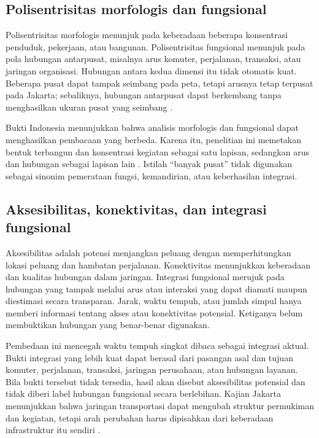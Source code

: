 \documentclass[11pt,a4paper,oneside,openany,indonesian]{report}
\begin{document}
\subsection{Polisentrisitas morfologis dan fungsional}

Polisentrisitas morfologis menunjuk pada keberadaan beberapa konsentrasi penduduk, pekerjaan, atau bangunan. Polisentrisitas fungsional menunjuk pada pola hubungan antarpusat, misalnya arus komuter, perjalanan, transaksi, atau jaringan organisasi. Hubungan antara kedua dimensi itu tidak otomatis kuat. Beberapa pusat dapat tampak seimbang pada peta, tetapi arusnya tetap terpusat pada Jakarta; sebaliknya, hubungan antarpusat dapat berkembang tanpa menghasilkan ukuran pusat yang seimbang \parencite{burgermeijers2012,degoeietal2010}.

Bukti Indonesia menunjukkan bahwa analisis morfologis dan fungsional dapat menghasilkan pembacaan yang berbeda. Karena itu, penelitian ini memetakan bentuk terbangun dan konsentrasi kegiatan sebagai satu lapisan, sedangkan arus dan hubungan sebagai lapisan lain \parencite{sadewoetal2021}. Istilah ``banyak pusat'' tidak digunakan sebagai sinonim pemerataan fungsi, kemandirian, atau keberhasilan integrasi.

\subsection{Aksesibilitas, konektivitas, dan integrasi fungsional}

Aksesibilitas adalah potensi menjangkau peluang dengan memperhitungkan lokasi peluang dan hambatan perjalanan. Konektivitas menunjukkan keberadaan dan kualitas hubungan dalam jaringan. Integrasi fungsional merujuk pada hubungan yang tampak melalui arus atau interaksi yang dapat diamati maupun diestimasi secara transparan. Jarak, waktu tempuh, atau jumlah simpul hanya memberi informasi tentang akses atau konektivitas potensial. Ketiganya belum membuktikan hubungan yang benar-benar digunakan.

Pembedaan ini mencegah waktu tempuh singkat dibaca sebagai integrasi aktual. Bukti integrasi yang lebih kuat dapat berasal dari pasangan asal dan tujuan komuter, perjalanan, transaksi, jaringan perusahaan, atau hubungan layanan. Bila bukti tersebut tidak tersedia, hasil akan disebut aksesibilitas potensial dan tidak diberi label hubungan fungsional secara berlebihan. Kajian Jakarta menunjukkan bahwa jaringan transportasi dapat mengubah struktur permukiman dan kegiatan, tetapi arah perubahan harus dipisahkan dari keberadaan infrastruktur itu sendiri \parencite{yudhistiraetal2019}.
\end{document}
